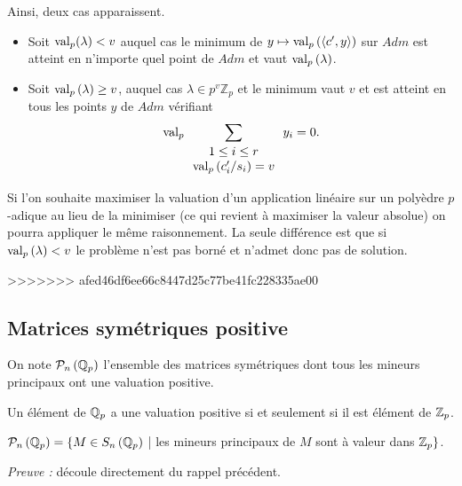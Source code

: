 Ainsi, deux cas apparaissent.
\begin{itemize}
	\item Soit $\text{val}_p( \lambda) < v$ auquel cas le minimum de $y\mapsto \text{val}_p\left(\left<c',y \right>\right)$ sur $Adm$ est atteint en n'importe quel point de $Adm$ et vaut $\text{val}_p\left( \lambda\right)$.
	\item Soit $\text{val}_p\left( \lambda \right) \ge v$, auquel cas $\lambda \in p^{v} \mathbb{Z}_p$ et le minimum vaut $v $ et est atteint en tous les points $y$ de $Adm$ vérifiant
	$$\text{val}_p\sum \limits_{\begin{array}{c} 1\le i\le r\\ \text{val}_p\left(c'_{i}/{s_{i}} \right) = v  \end{array}   } y_{i} = 0.$$ 

\end{itemize}
\begin{remarque}
	Si l'on souhaite maximiser la valuation d'un application linéaire sur un polyèdre $p$-adique au lieu de la minimiser (ce qui revient à maximiser la valeur absolue) on pourra appliquer le même raisonnement. La seule différence est que si $\text{val}_p\left( \lambda\right) < v$ le problème n'est pas borné et n'admet donc pas de solution. 
\end{remarque}

>>>>>>> afed46df6ee66c8447d25c77be41fc228335ae00
\iffalse
\subsection{Matrices symétriques positive} 

\begin{definition}
	On note $\mathcal{P}_n\left( \mathbb{Q}_p \right) $ l'ensemble des matrices symétriques dont tous les mineurs principaux ont une valuation positive.
\end{definition} 

\begin{rappel}
	
Un élément de $ \mathbb{Q}_p$ a une valuation positive si et seulement si il est élément de $ \mathbb {Z}_p $. 
\end{rappel}

\begin{propriete}
	
	$\mathcal{P}_n\left( \mathbb{Q}_p \right) = \{ M \in S_n\left( \mathbb{Q}_p \right)$ | les\- min\-eurs\- prin\-ci\-paux\- de\- $M$ \-sont \-à \-va\-leur \-dans\- $ \mathbb {Z}_p  \} $.
\end{propriete}

	\textit{Preuve :} découle directement du rappel précédent. 
	\medskip


